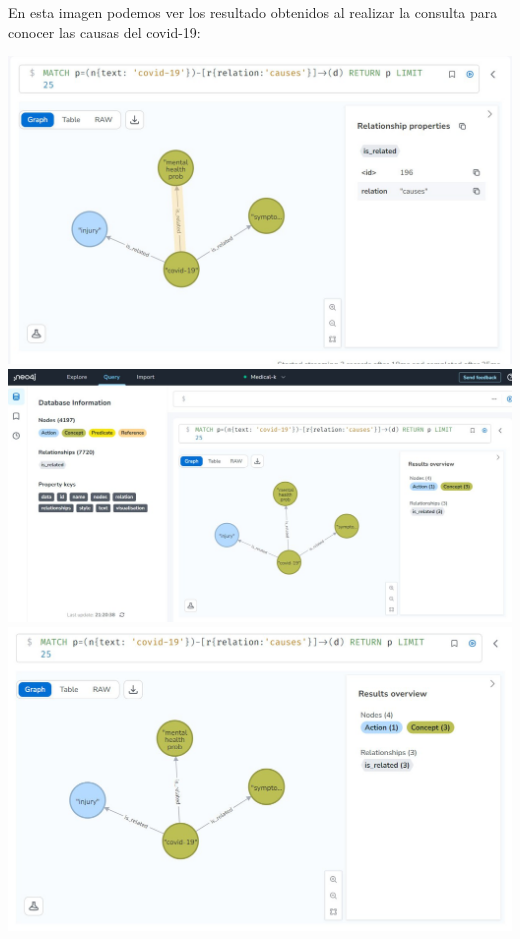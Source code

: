 \documentclass[10pt]{article} %
\begin{document}
	En esta imagen podemos ver los resultado obtenidos al realizar la consulta para conocer las causas del covid-19:
	
	\begin{center}
		\includegraphics[scale=0.5]{../images/imagecons}
		\includegraphics[scale=0.5]{../images/imagecons1}
		\includegraphics[scale=0.5]{../images/imageconsulta}
	\end{center}
\end{document}
